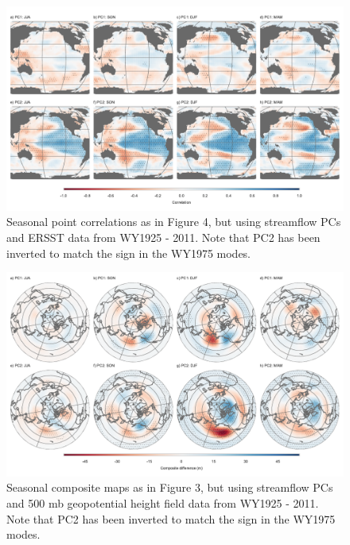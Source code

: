 \documentclass[final, double]{ua-thesis}
\begin{document}
\begin{figure}[ht]
\centering
\centerline{\includegraphics[width=190mm]{p1figures/s6.pdf}}
\caption{Seasonal point correlations as in Figure 4, but using streamflow PCs and ERSST data from WY1925 - 2011. Note that PC2 has been inverted to match the sign in the WY1975 modes.}
\label{sfig:corrsst}
\end{figure}

\begin{figure}[ht]
\centering
\centerline{\includegraphics[width=190mm]{p1figures/s7.pdf}}
\caption{Seasonal composite maps as in Figure 3, but using streamflow PCs and 500 mb geopotential height field data from WY1925 - 2011. Note that PC2 has been inverted to match the sign in the WY1975 modes.}
\label{sfig:comphgt}
\end{figure}
\end{document}
